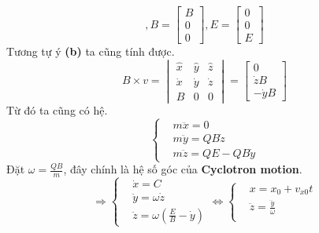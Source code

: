 \begin{enumerate}
\[, B =
\begin{bmatrix}
B\\
0\\
0
\end{bmatrix}
, E =
\begin{bmatrix}
0\\
0\\
E
\end{bmatrix}
\]
Tương tự ý \textbf{(b)} ta cũng tính được.
\[
B \times v
=
\begin{vmatrix}
\hat{x} & \hat{y} &\hat{z} \\
\dot{x} & \dot{y} & \dot{z} \\
B & 0 & 0
\end{vmatrix}
=
\begin{bmatrix}
0 \\
\dot{z}B \\
-\dot{y}B
\end{bmatrix}
\]
Từ đó ta cũng có hệ.
\[
\begin{cases}
&m\ddot{x} = 0\\[6pt]

&m\ddot{y} =QB\dot{z} \\[6pt]

&m\ddot{z} = QE -QB\dot{y}
\end{cases}
\]
Đặt $\omega = \frac{QB}{m}$, đây chính là hệ số góc của \textbf{Cyclotron motion}.
\[
\Rightarrow
\begin{cases}
&\dot{x} = C \\[6pt]

&\ddot{y} =\omega\dot{z} \\[6pt]

&\ddot{z} = \omega(\frac{E}{B}-\dot{y})
\end{cases}
\Leftrightarrow
\begin{cases}
&x = x_{0} + v_{x0}t \\[6pt]

&\ddot{z} = \frac{\dddot{y}}{\omega}\\[6pt]


\end{cases}\]
\end{enumerate}
